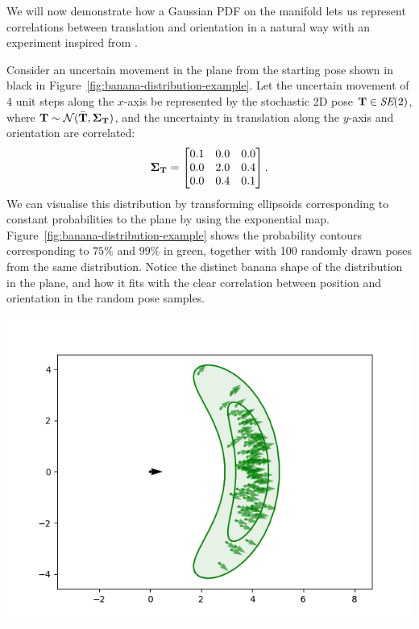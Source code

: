 \begin{example}[frametitle=The banana distribution is Gaussian]
We will now demonstrate how a Gaussian PDF on the manifold lets us represent correlations between translation and orientation in a natural way with an experiment inspired from \cite{Long2012TheCoordinates}.

Consider an uncertain movement in the plane from the starting pose shown in black in Figure~\ref{fig:banana-distribution-example}.
Let the uncertain movement of 4 unit steps along the $x$-axis be represented by the stochastic 2D pose ${\boldsymbol{\mathbf{T}}} \in \textit{SE}(2)$, where ${\boldsymbol{\mathbf{T}}} \sim \mathcal{N}(\bar{{\boldsymbol{\mathbf{T}}}}, {\boldsymbol{\mathbf{\Sigma}}}_{\boldsymbol{\mathbf{T}}})$, and the uncertainty in translation along the $y$-axis and orientation are correlated:
\begin{equation*}
  {\boldsymbol{\mathbf{\Sigma}}}_{\boldsymbol{\mathbf{T}}} =
  \begin{bmatrix}
    0.1 & 0.0 & 0.0 \\
    0.0 & 2.0 & 0.4 \\
    0.0 & 0.4 & 0.1
  \end{bmatrix}.
\end{equation*}
We can visualise this distribution by transforming ellipsoids corresponding to constant probabilities to the plane by using the exponential map.
Figure~\ref{fig:banana-distribution-example} shows the probability contours corresponding to $75\%$ and $99\%$ in green, together with 100 randomly drawn poses from the same distribution.
Notice the distinct banana shape of the distribution in the plane, and how it fits with the clear correlation between position and orientation in the random pose samples.

{
  \centering
  \includegraphics[width=0.75\columnwidth]{figures/banana-distribution.png}
  \captionsetup{type=figure}
  \label{fig:banana-distribution-example}
  \par
}
\end{example}

